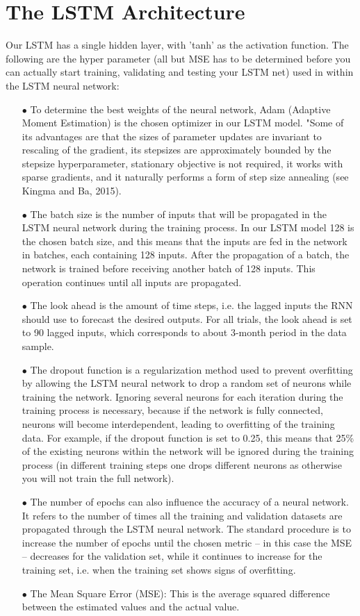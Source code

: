 \documentclass[a4paper,11pt,oneside]{book}
\begin{document}
\section{The LSTM Architecture}
Our LSTM has a single hidden layer,  with 'tanh' as the activation function. The following are the hyper parameter (all but MSE has to be determined before you can actually start training, validating and testing your LSTM net) used in within the LSTM neural network:
\begin{itemize}

\item[$\bullet$]   
To determine the best weights of the neural network, Adam (Adaptive Moment Estimation) is the chosen optimizer in our LSTM model. "Some of its advantages are that the sizes of parameter updates are invariant to
rescaling of the gradient, its stepsizes are approximately bounded by the stepsize hyperparameter, stationary objective is not required, it works with sparse gradients, and it naturally performs a
form of step size annealing (see Kingma and Ba, 2015).
\item[$\bullet$] The batch size is the number of inputs that will be propagated in the
LSTM neural network during the training process. In our LSTM model 128 is the chosen batch size, and this means that the inputs are
fed in the network in batches, each containing 128 inputs. After
the propagation of a batch, the network is trained before receiving another
batch of 128 inputs. This operation continues until all inputs are propagated.
\item[$\bullet$] The look ahead is the amount of time steps, i.e. the lagged
inputs the RNN should use to forecast the desired outputs. For all trials, the look ahead is set to 90 lagged inputs, which
corresponds to about 3-month period in the data sample.
\item[$\bullet$] The dropout function is a regularization method used to prevent overfitting by
allowing the LSTM neural network to drop a random set of neurons while
training the network. Ignoring several neurons for each iteration during the
training process is necessary, because if the network is fully connected,
neurons will become interdependent, leading to overfitting of the training data. For example, if the dropout function is set to 0.25, this means that 25\% of the existing
neurons within the network will be ignored during the training process (in different training steps one drops different neurons as otherwise you will not train the full network).
\item[$\bullet$] The number of epochs can also influence the accuracy of a neural network. It
refers to the number of times all the training and validation datasets are
propagated through the LSTM neural network. The standard procedure is to
increase the number of epochs until the chosen metric – in this case the MSE
– decreases for the validation set, while it continues to increase for the training
set, i.e. when the training set shows signs of overfitting.
\item[$\bullet$] The Mean Square Error (MSE): This is the average squared difference between the estimated values and the actual value.
\end{itemize}
\end{document}
